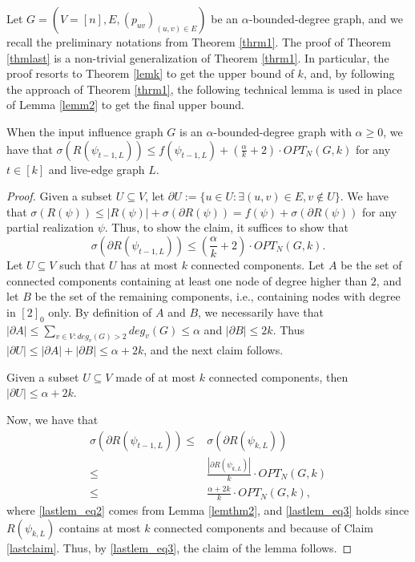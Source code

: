 Let $G=(V=[n],E,(p_{uv})_{(u,v)\in E})$ be an $\alpha$-bounded-degree graph, and we recall the preliminary notations from Theorem \ref{thrm1}. The proof of Theorem \ref{thmlast} is a non-trivial generalization of Theorem \ref{thrm1}. In particular, the proof resorts to Theorem \ref{lemk} to get the upper bound of $k$, and, by following the approach of Theorem \ref{thrm1}, the following technical lemma is used in place of Lemma \ref{lemm2} to get the final upper bound. 
\begin{lemma}\label{lemlast}
When the input influence graph $G$ is an $\alpha$-bounded-degree graph with $\alpha\geq 0$, we have that $
\sigma(R(\psi_{t-1,L}))\leq f(\psi_{t-1,L})+\left(\frac{\alpha}{k}+2\right)\cdot OPT_N(G,k)$ for any $t\in [k]$ and live-edge graph $L$.
\end{lemma}
\begin{proof}%
Given a subset $U\subseteq V$, let $\partial U:=\{u\in U: \exists (u,v)\in E,v\notin U\}$. We have that $\sigma(R(\psi))\leq |R(\psi)|+\sigma(\partial R(\psi))=f(\psi)+\sigma(\partial R(\psi))$ for any partial realization $\psi$. Thus, to show the claim, it suffices to show that 
\begin{equation*}%
\sigma(\partial R(\psi_{t-1,L}))\leq \left(\frac{\alpha}{k}+2\right)\cdot OPT_N(G,k).
\end{equation*}
Let $U\subseteq V$ such that $U$ has at most $k$ connected components. Let $A$ be the set of connected components containing at least one node of degree higher than $2$, and let $B$ be the set of the remaining components, i.e., containing nodes with degree in $[2]_0$ only. By definition of $A$ and $B$, we necessarily have that $|\partial A|\leq \sum_{v\in V:deg_v(G)>2}deg_v(G)\leq \alpha$ and $|\partial B|\leq 2k$. Thus $|\partial U|\leq |\partial A|+|\partial B|\leq \alpha+2k$, and the next claim follows.
\begin{claim}\label{lastclaim}
Given a subset $U\subseteq V$ made of at most $k$ connected components, then $|\partial U|\leq \alpha+2k$. 
\end{claim}
Now, we have that
\begin{align}
\sigma(\partial R(\psi_{t-1,L}))\leq & \sigma(\partial R(\psi_{k,L}))\nonumber\\
\leq & \frac{|\partial R(\psi_{k,L})|}{k}\cdot OPT_N(G,k)\label{lastlem_eq2}\\
\leq & \frac{\alpha+2k}{k}\cdot OPT_N(G,k),\label{lastlem_eq3}
\end{align}
where \eqref{lastlem_eq2} comes from Lemma \ref{lemthm2}, and \eqref{lastlem_eq3} holds since $R(\psi_{k,L})$ contains at most $k$ connected components and because of Claim \ref{lastclaim}. Thus, by \eqref{lastlem_eq3}, the claim of the lemma follows. 
\end{proof}

